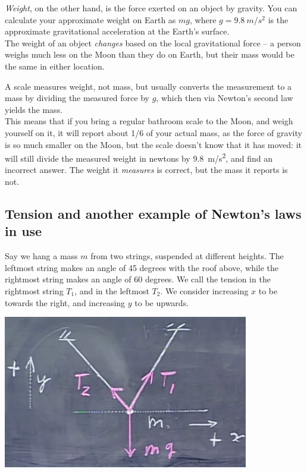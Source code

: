 \documentclass[8.01x]{subfiles}
\begin{document}
\emph{Weight}, on the other hand, is the force exerted on an object by gravity. You can calculate your approximate weight on Earth as $m g$, where $g = \SI{9.8}{m/s^2}$ is the approximate gravitational acceleration at the Earth's surface.\\
The weight of an object \emph{changes} based on the local gravitational force -- a person weighs much less on the Moon than they do on Earth, but their mass would be the same in either location.

A scale measures weight, not mass, but usually converts the measurement to a mass by dividing the measured force by $g$, which then via Newton's second law yields the mass.\\
This means that if you bring a regular bathroom scale to the Moon, and weigh yourself on it, it will report about 1/6 of your actual mass, as the force of gravity is so much smaller on the Moon, but the scale doesn't know that it has moved: it will still divide the measured weight in newtons by \SI{9.8}{m/s^2}, and find an incorrect answer. The weight it \emph{measures} is correct, but the mass it reports is not.

\subsection{Tension and another example of Newton's laws in use}

Say we hang a mass $m$ from two strings, suspended at different heights. The leftmost string makes an angle of 45 degrees with the roof above, while the rightmost string makes an angle of 60 degrees. We call the tension in the rightmost string $T_1$, and in the leftmost $T_2$. We consider increasing $x$ to be towards the right, and increasing $y$ to be upwards.

\begin{center}
\includegraphics[scale=0.6]{Graphics/lec6_tension}
\end{center}
\end{document}
